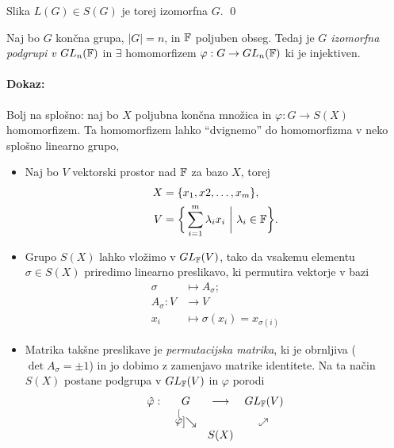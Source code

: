\ni Slika $L(G) \in S(G)$ je torej izomorfna $G$.
\qed

\begin{posledica}
	Naj bo $G$ kon\v cna grupa, $|G| = n$, in $\mathbb{F}$ poljuben obseg. Tedaj je \emph{$G$ izomorfna podgrupi v $GL_n(\mathbb{F})$} in
	$\exists$ homomorfizem $\varphi : G \to GL_n(\mathbb{F})$ ki je injektiven.
\end{posledica}

\paragraph{Dokaz:}

Bolj na splo\v sno: naj bo $X$ poljubna kon\v cna mno\v zica in $\varphi: G \to S(X)$ homomorfizem. Ta homomorfizem lahko "`dvignemo"'
do homomorfizma v neko splo\v sno linearno grupo,
\begin{itemize}
	\item{Naj bo $V$ vektorski prostor nad $\mathbb{F}$ za bazo $X$, torej
		\begin{align*}
			X &= \{x_1, x2, \ldots, x_m\}, \\
			V &= \bigg\{\sum_{i = 1}^m \lambda_i x_i\ \bigg|\ \lambda_i \in \F\bigg\}.
		\end{align*}}
	\item{Grupo $S(X)$ lahko vlo\v zimo v $GL_{\mathbb{F}}(V)$, tako da vsakemu elementu 
		$\sigma \in S(X)$ priredimo linearno preslikavo, ki permutira vektorje v bazi
		\begin{align*}
			\sigma &\mapsto A_{\sigma};\\
			A_{\sigma} : V &\to V \\
			x_i &\mapsto \sigma(x_i) = x_{\sigma(i)}
		\end{align*}}
	\item{Matrika tak\v sne preslikave je \emph{permutacijska matrika}, ki je obrnljiva ($\det A_\sigma = \pm 1$) in jo dobimo
		z zamenjavo matrike identitete. Na ta na\v cin $S(X)$ postane podgrupa v $GL_{\mathbb{F}}(V)$ in $\varphi$ porodi
		\begin{equation*}
		\begin{matrix}
			\hat{\varphi} :\ &G                              & \longrightarrow & GL_{\F} (V) \\
			                 &\stackrel[\varphi]{}{\searrow} &                 & \nehookarrow \\
			                 &                               & S(X)            &
		\end{matrix}
		\end{equation*}
	}
\end{itemize}

